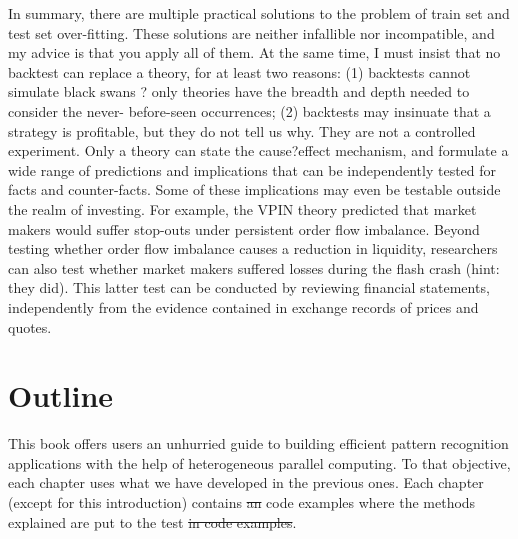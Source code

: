 \documentclass[10pt]{article}[draft]
\begin{document}
In summary, there are multiple practical solutions to the problem of train set and test set over-fitting. These solutions are neither infallible nor incompatible, and my advice is that you apply all of them. At the same time, I must insist that no backtest can replace a theory, for at least two reasons: (1) backtests cannot simulate black swans ? only theories have the breadth and depth needed to consider the never- before-seen occurrences; (2) backtests may insinuate that a strategy is profitable, but they do not tell us why. They are not a controlled experiment. Only a theory can state the cause?effect mechanism, and formulate a wide range of predictions and implications that can be independently tested for facts and counter-facts. Some of these implications may even be testable outside the realm of investing. For example, the VPIN theory predicted that market makers would suffer stop-outs under persistent order flow imbalance. Beyond testing whether order flow imbalance causes a reduction in liquidity, researchers can also test whether market makers suffered losses during the flash crash (hint: they did). This latter test can be conducted by reviewing financial statements, independently from the evidence contained in exchange records of prices and quotes.
		
\newpage
\section{Outline}
		
This book offers users an unhurried guide to building efficient pattern recognition applications with the help of heterogeneous parallel computing. To that objective, each chapter uses what we have developed in the previous ones. Each chapter (except for this introduction) contains \st{an} code examples where the methods explained are put to the test\st{ in code examples}.
		
\end{document}
